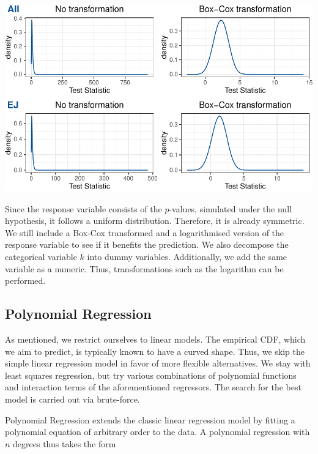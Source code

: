 \documentclass[12pt,a4paper]{article}
\let\origfigure\figure
\let\endorigfigure\endfigure
\renewenvironment{figure}[1][2] {
    \expandafter\origfigure\expandafter[H]
} {
    \endorigfigure
}
\begin{document}
\begin{figure}
\centering
\includegraphics{p_approx_paper_files/figure-latex/density_plots-1.pdf}
\caption{\label{fig:density} Densities of the untransformed and
Box-Cox-transformed test statistic for test types all and EJ, shown for
case = 1 and \(k = 1\).}
\end{figure}

Since the response variable consists of the \(p\)-values, simulated
under the null hypothesis, it follows a uniform distribution. Therefore,
it is already symmetric. We still include a Box-Cox transformed and a
logarithmised version of the response variable to see if it benefits the
prediction. We also decompose the categorical variable \(k\) into dummy
variables. Additionally, we add the same variable as a numeric. Thus,
transformations such as the logarithm can be performed.

\hypertarget{polynomial-regression}{%
\subsection{Polynomial Regression}\label{polynomial-regression}}

As mentioned, we restrict ourselves to linear models. The empirical
\ac{CDF}, which we aim to predict, is typically known to have a curved
shape. Thus, we skip the simple linear regression model in favor of more
flexible alternatives. We stay with least squares regression, but try
various combinations of polynomial functions and interaction terms of
the aforementioned regressors. The search for the best model is carried
out via brute-force.

Polynomial Regression extends the classic linear regression model by
fitting a polynomial equation of arbitrary order to the data. A
polynomial regression with \(n\) degrees thus takes the form
\end{document}
